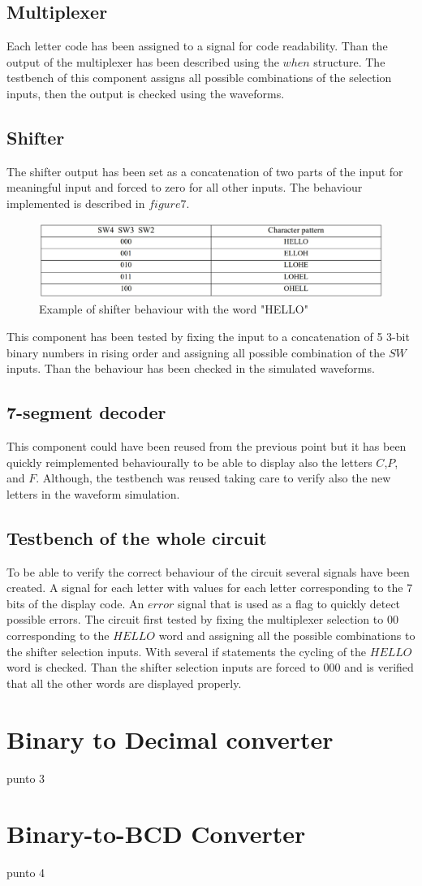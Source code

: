 \documentclass[12pt]{article}
\begin{document}
\subsection{Multiplexer}
Each letter code has been assigned to a signal for code readability. Than the output of the multiplexer has been described using the $when$ structure.
The testbench of this component assigns all possible combinations of the selection inputs, then the output is checked using the waveforms.
\subsection{Shifter}
The shifter output has been set as a concatenation of two parts of the input for meaningful input and forced to zero for all other inputs. The behaviour implemented is described in $figure 7$.
\begin{figure}[h]
	\centering
	\includegraphics[scale = 0.2]{Berchialla_PuntoB/image3.jpg}
	\caption{Example of shifter behaviour with the word "HELLO"}
\end{figure}
This component has been tested by fixing the input to a concatenation of 5 3-bit binary numbers in rising order and assigning all possible combination of the $SW$ inputs. Than the behaviour has been checked in the simulated waveforms.
\subsection{7-segment decoder}
This component could have been reused from the previous point but it has been quickly reimplemented behaviourally to be able to display also the letters $C$,$P$, and $F$. Although, the testbench was reused taking care to verify also the new letters in the waveform simulation.
\subsection{Testbench of the whole circuit}
To be able to verify the correct behaviour of the circuit several signals have been created.
A signal for each letter with values for each letter corresponding to the 7 bits of the display code.
An $error$ signal that is used as a flag to quickly detect possible errors.
The circuit first tested by fixing the multiplexer selection to $00$ corresponding to the $HELLO$ word and assigning all the possible combinations to the shifter selection inputs. With several if statements the cycling of the $HELLO$ word is checked. 
Than the shifter selection inputs are forced to $000$ and is verified that all the other words are displayed properly.
\section{ Binary to Decimal converter}
punto 3
\section{ Binary-to-BCD Converter}
punto 4
\end{document}
